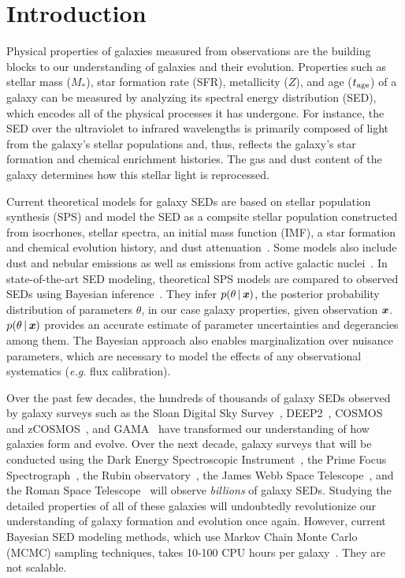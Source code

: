 \section{Introduction} \label{sec:intro} 
Physical properties of galaxies measured from observations are the building
blocks to our understanding of galaxies and their evolution. 
Properties such as stellar mass ($M_*$), star formation rate (SFR), metallicity
($Z$), and age ($t_{\rm age}$) of a galaxy can be measured by analyzing its
spectral energy distribution (SED), which encodes all of the physical
processes it has undergone. 
For instance, the SED over the ultraviolet to infrared wavelengths is primarily
composed of light from the galaxy's stellar populations and, thus, reflects the
galaxy's star formation and chemical enrichment histories.  
The gas and dust content of the galaxy determines how this stellar light is
reprocessed.  

Current theoretical models for galaxy SEDs are based on stellar population
synthesis (SPS) and model the SED as a compsite stellar population constructed
from isocrhones, stellar spectra, an initial mass function (IMF), a star
formation and chemical evolution history, and dust
attenuation~\citep[\emph{e.g.}][see \citealt{walcher2011, conroy2013} for a
comprehensive review]{bruzual2003, maraston2005, conroy2009}.
Some models also include dust and nebular emissions as well as emissions from
active galactic nuclei~\citep[\emph{e.g.}][]{johnson2021}.
In state-of-the-art SED modeling, theoretical SPS models are compared to
observed SEDs using Bayesian inference~\citep{acquaviva2011, chevallard2016,
leja2017, carnall2018, johnson2021, hahn2022}. 
They infer $p(\theta\,|\,\textbf{\textit{x}})$, the posterior probability distribution of
parameters $\theta$, in our case galaxy properties, given observation
$\textbf{\textit{x}}$. 
$p(\theta\,|\,\textbf{\textit{x}})$ provides an accurate estimate of parameter
uncertainties and degerancies among them. 
The Bayesian approach also enables marginalization over nuisance parameters,
which are necessary to model the effects of any observational systematics
(\emph{e.g.} flux calibration).

Over the past few decades, the hundreds of thousands of galaxy SEDs observed by
galaxy surveys such as the Sloan Digital Sky Survey~\citep[SDSS;][]{york2000},
DEEP2~\citep{davis2003}, COSMOS and zCOSMOS~\citep{scoville2007, lilly2007},
and GAMA~\citep{baldry2018} have transformed our understanding of how galaxies
form and evolve. 
Over the next decade, galaxy surveys that will be conducted using the 
Dark Energy Spectroscopic Instrument~\citep[DESI;][]{desicollaboration2016},
the Prime Focus Spectrograph~\citep[PFS;][]{takada2014}, 
the Rubin observatory~\citep{ivezic2019}, 
the James Webb Space Telescope~\citep{gardner2006},
and the Roman Space Telescope~\citep{spergel2015} will observe \emph{billions}
of galaxy SEDs. 
Studying the detailed properties of all of these galaxies will undoubtedly
revolutionize our understanding of galaxy formation and evolution once again. 
However, current Bayesian SED modeling methods, which use Markov Chain Monte
Carlo (MCMC) sampling techniques, takes 10-100 CPU hours per
galaxy~\citep[\emph{e.g.}][]{carnall2019a, tacchella2021}. 
They are not scalable. 

